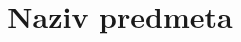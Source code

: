 \documentclass{studosi-workbook}
\begin{document}
    \title{Naziv predmeta}
    \maketitle
\end{document}
